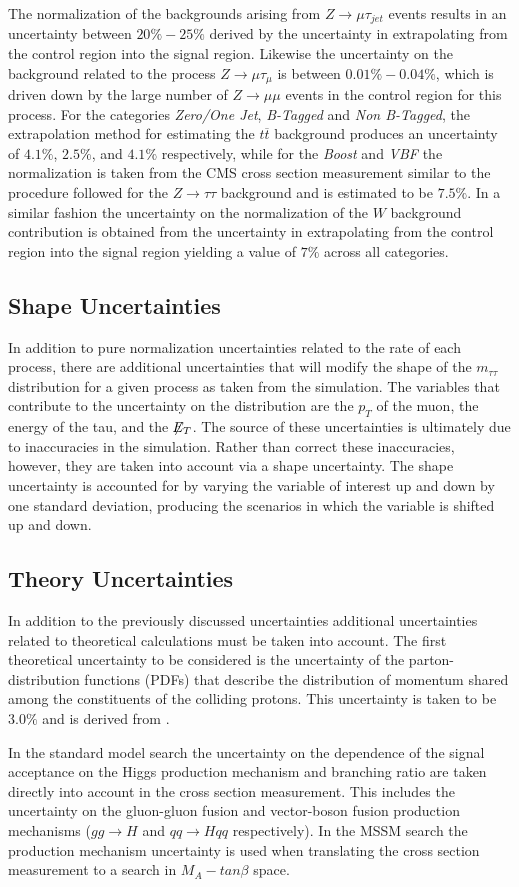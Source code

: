 The normalization of the backgrounds arising from $Z \rightarrow \mu\tau_{jet}$ events results in an uncertainty between $20\% - 25\%$ derived by the uncertainty in extrapolating from the control region into the signal region.
Likewise the uncertainty on the background related to the process $Z\rightarrow\mu\tau_{\mu}$ is between $0.01\% - 0.04\%$, which is driven down by the large number of $Z\rightarrow\mu\mu$ events in the control region for this process.
For the categories \emph{Zero/One Jet}, \emph{B-Tagged} and \emph{Non B-Tagged}, the extrapolation method for estimating the $t\overline{t}$ background produces an uncertainty of $4.1\%$, $2.5\%$, and $4.1\%$ respectively, while for the \emph{Boost} and \emph{VBF} the normalization is taken from the CMS cross section measurement similar to the procedure followed for the $Z\rightarrow\tau\tau$ background and is estimated to be $7.5\%$.
In a similar fashion the uncertainty on the normalization of the $W$ background contribution is obtained from the uncertainty in extrapolating from the control region into the signal region yielding a value of $7\%$ across all categories. 

\subsection{Shape Uncertainties}
In addition to pure normalization uncertainties related to the rate of each process, there are additional uncertainties that will modify the shape of the $m_{\tau\tau}$ distribution for a given process as taken from the simulation.
The variables that contribute to the uncertainty on the distribution are the $p_{T}$ of the muon, the energy of the tau, and the $\not\!\!{E}_{T}$.
The source of these uncertainties is ultimately due to inaccuracies in the simulation. 
Rather than correct these inaccuracies, however, they are taken into account via a shape uncertainty.
The shape uncertainty is accounted for by varying the variable of interest up and down by one standard deviation, producing the scenarios in which the variable is shifted up and down.

\subsection{Theory Uncertainties}
In addition to the previously discussed uncertainties additional uncertainties related to theoretical calculations must be taken into account.
The first theoretical uncertainty to be considered is the uncertainty of the parton-distribution functions (PDFs) that describe the distribution of momentum shared among the constituents of the colliding protons.
This uncertainty is taken to be $3.0\%$ and is derived from \cite{PDFUNCERTAINTY}.

In the standard model search the uncertainty on the dependence of the signal acceptance on the Higgs production mechanism and branching ratio are taken directly into account in the cross section measurement.
This includes the uncertainty on the gluon-gluon fusion and vector-boson fusion production mechanisms ($gg \rightarrow H$ and $qq \rightarrow Hqq$ respectively)\cite{HIGGS_PRODUCTION}.
In the MSSM search the production mechanism uncertainty is used when translating the cross section measurement to a search in $M_{A}-tan\beta$ space.
